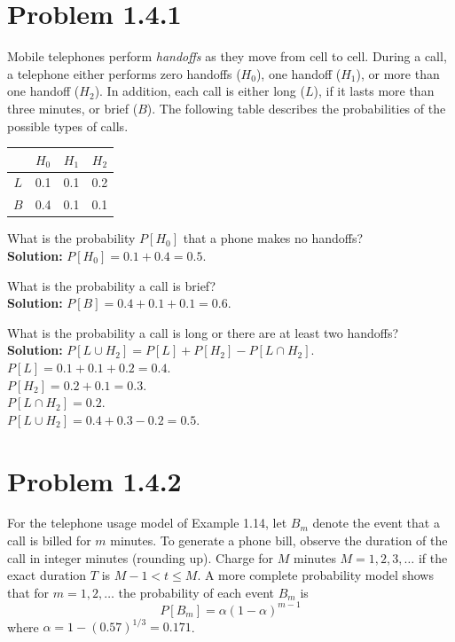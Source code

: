 \documentclass{article}
\begin{document}
\newpage

\section*{Problem 1.4.1}
Mobile telephones perform \textit{handoffs} as they move from cell to cell. During a call, a telephone either performs zero handoffs ($H_0$), one handoff ($H_1$), or more than one handoff ($H_2$). In addition, each call is either long ($L$), if it lasts more than three minutes, or brief ($B$). The following table describes the probabilities of the possible types of calls.

\begin{center}
\begin{tabular}{c|ccc}
 & $H_0$ & $H_1$ & $H_2$ \\
\hline
$L$ & 0.1 & 0.1 & 0.2 \\
$B$ & 0.4 & 0.1 & 0.1
\end{tabular}
\end{center}

\noindent
What is the probability $P[H_0]$ that a phone makes no handoffs? \\
\textbf{Solution:} $P[H_0] = 0.1 + 0.4 = 0.5$.

\noindent
What is the probability a call is brief? \\
\textbf{Solution:} $P[B] = 0.4 + 0.1 + 0.1 = 0.6$.

\noindent
What is the probability a call is long or there are at least two handoffs? \\
\textbf{Solution:} $P[L \cup H_2] = P[L] + P[H_2] - P[L \cap H_2]$. \\
$P[L] = 0.1+0.1+0.2 = 0.4$. \\
$P[H_2] = 0.2+0.1 = 0.3$. \\
$P[L \cap H_2] = 0.2$. \\
$P[L \cup H_2] = 0.4 + 0.3 - 0.2 = 0.5$.

\newpage

\section*{Problem 1.4.2}
For the telephone usage model of Example 1.14, let $B_m$ denote the event that a call is billed for $m$ minutes. To generate a phone bill, observe the duration of the call in integer minutes (rounding up). Charge for $M$ minutes $M = 1, 2, 3, \dots$ if the exact duration $T$ is $M - 1 < t \le M$. A more complete probability model shows that for $m = 1, 2, \dots$ the probability of each event $B_m$ is
\[ P[B_m] = \alpha(1 - \alpha)^{m-1} \]
where $\alpha = 1 - (0.57)^{1/3} = 0.171$.
\end{document}
